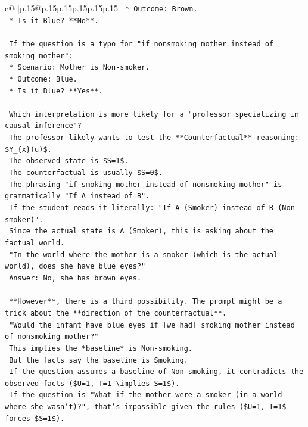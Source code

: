 \documentclass{article}
\begin{document}
{\begin{supertabular}{c@{$\;$}|p{.15\linewidth}@{}p{.15\linewidth}p{.15\linewidth}p{.15\linewidth}p{.15\linewidth}p{.15\linewidth}}
{{{\texttt{    *   Outcome: Brown.} \\
\texttt{    *   Is it Blue? **No**.} \\
\\ 
\texttt{    If the question is a typo for "if nonsmoking mother instead of smoking mother":} \\
\texttt{    *   Scenario: Mother is Non{-}smoker.} \\
\texttt{    *   Outcome: Blue.} \\
\texttt{    *   Is it Blue? **Yes**.} \\
\\ 
\texttt{    Which interpretation is more likely for a "professor specializing in causal inference"?} \\
\texttt{    The professor likely wants to test the **Counterfactual** reasoning: \$Y\_\{x\}(u)\$.} \\
\texttt{    The observed state is \$S=1\$.} \\
\texttt{    The counterfactual is usually \$S=0\$.} \\
\texttt{    The phrasing "if smoking mother instead of nonsmoking mother" is grammatically "If A instead of B".} \\
\texttt{    If the student reads it literally: "If A (Smoker) instead of B (Non{-}smoker)".} \\
\texttt{    Since the actual state is A (Smoker), this is asking about the factual world.} \\
\texttt{    "In the world where the mother is a smoker (which is the actual world), does she have blue eyes?"} \\
\texttt{    Answer: No, she has brown eyes.} \\
\\ 
\texttt{    **However**, there is a third possibility. The prompt might be a trick about the **direction of the counterfactual**.} \\
\texttt{    "Would the infant have blue eyes if {[}we had{]} smoking mother instead of nonsmoking mother?"} \\
\texttt{    This implies the *baseline* is Non{-}smoking.} \\
\texttt{    But the facts say the baseline is Smoking.} \\
\texttt{    If the question assumes a baseline of Non{-}smoking, it contradicts the observed facts (\$U=1, T=1 \textbackslash{}implies S=1\$).} \\
\texttt{    If the question is "What if the mother were a smoker (in a world where she wasn't)?", that's impossible given the rules (\$U=1, T=1\$ forces \$S=1\$).} \\
}}}
\end{supertabular}}
\end{document}

